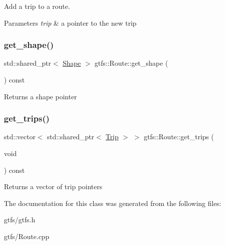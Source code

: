 Add a trip to a route. 
\begin{DoxyParams}{Parameters}
{\em trip} & a pointer to the new trip \\
\hline
\end{DoxyParams}
\mbox{\label{classgtfs_1_1Route_a4d3d7b29be342ae806041801327762a8}} 
\subsubsection{\texorpdfstring{get\+\_\+shape()}{get\_shape()}}
{\footnotesize\ttfamily std\+::shared\+\_\+ptr$<$ \hyperlink{classgtfs_1_1Shape}{Shape} $>$ gtfs\+::\+Route\+::get\+\_\+shape (\begin{DoxyParamCaption}{ }\end{DoxyParamCaption}) const}

\begin{DoxyReturn}{Returns}
a shape pointer 
\end{DoxyReturn}
\mbox{\label{classgtfs_1_1Route_a763ea7a09f20972019198515da6a1c05}} 
\subsubsection{\texorpdfstring{get\+\_\+trips()}{get\_trips()}}
{\footnotesize\ttfamily std\+::vector$<$ std\+::shared\+\_\+ptr$<$ \hyperlink{classgtfs_1_1Trip}{Trip} $>$ $>$ gtfs\+::\+Route\+::get\+\_\+trips (\begin{DoxyParamCaption}\item[{void}]{ }\end{DoxyParamCaption}) const}

\begin{DoxyReturn}{Returns}
a vector of trip pointers 
\end{DoxyReturn}


The documentation for this class was generated from the following files\+:\begin{DoxyCompactItemize}
\item 
gtfs/gtfs.\+h\item 
gtfs/Route.\+cpp\end{DoxyCompactItemize}

